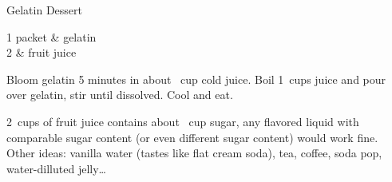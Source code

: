 
\begin{recipe}{Gelatin Dessert}
  \maketitle

  \begin{ingredients2}
    1 packet & gelatin\\
    2 \cups & fruit juice
  \end{ingredients2}
  Bloom gelatin 5 minutes in about \half~cup cold juice. Boil 1\half~cups
  juice and pour over gelatin, stir until dissolved. Cool and eat.

  \begin{note}
    2~cups of fruit juice contains about \fourth~cup sugar, any flavored
    liquid with comparable sugar content (or even different sugar content)
    would work fine. Other ideas: vanilla water (tastes like flat cream
    soda), tea, coffee, soda pop, water-dilluted jelly\dots
  \end{note}
\end{recipe}

